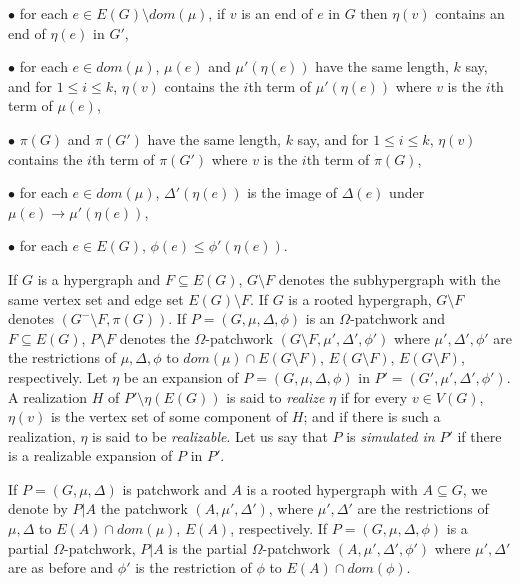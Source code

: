 \hspace*{12pt}$\bullet$ for each $e \in E(G) \setminus dom(\mu)$, if $v$ is an end of $e$ in $G$ then $\eta(v)$ contains an end of $\eta(e)$ in $G'$,

\hspace*{12pt}$\bullet$ for each $e \in dom(\mu)$, $\mu(e)$ and $\mu'(\eta(e))$ have the same length, $k$ say, and for $1 \le i \le k$, $\eta(v)$ contains the $i$th term of $\mu'(\eta(e))$ where $v$ is the $i$th term of $\mu(e)$,

\hspace*{12pt}$\bullet$ $\pi(G)$ and $\pi(G')$ have the same length, $k$ say, and for $1 \le i \le k$, $\eta(v)$ contains the $i$th term of $\pi(G')$ where $v$ is the $i$th term of $\pi(G)$,

\hspace*{12pt}$\bullet$ for each $e \in dom(\mu)$, $\Delta'(\eta(e))$ is the image of $\Delta(e)$ under $\mu(e) \to \mu'(\eta(e))$,

\hspace*{12pt}$\bullet$ for each $e \in E(G)$, $\phi(e) \le \phi'(\eta(e))$.

If $G$ is a hypergraph and $F \subseteq E(G)$, $G \setminus F$ denotes the subhypergraph with the same vertex set and edge set $E(G) \setminus F$. If $G$ is a rooted hypergraph, $G \setminus F$ denotes $(G^- \setminus F, \pi(G))$. If $P = (G, \mu, \Delta, \phi)$ is an $\Omega$-patchwork and $F \subseteq E(G)$, $P \setminus F$ denotes the $\Omega$-patchwork $(G \setminus F, \mu', \Delta', \phi')$ where $\mu', \Delta', \phi'$ are the restrictions of $\mu, \Delta, \phi$ to $dom(\mu) \cap E(G \setminus F)$, $E(G \setminus F)$, $E(G \setminus F)$, respectively. Let $\eta$ be an expansion of $P = (G, \mu, \Delta, \phi)$ in $P' = (G', \mu', \Delta', \phi')$. A realization $H$ of $P' \setminus \eta(E(G))$ is said to \textit{realize} $\eta$ if for every $v \in V(G)$, $\eta(v)$ is the vertex set of some component of $H$; and if there is such a realization, $\eta$ is said to be \textit{realizable}. Let us say that $P$ is \textit{simulated in} $P'$ if there is a realizable expansion of $P$ in $P'$.

If $P = (G, \mu, \Delta)$ is patchwork and $A$ is a rooted hypergraph with $A \subseteq G$, we denote by $P|A$ the patchwork $(A, \mu', \Delta')$, where $\mu', \Delta'$ are the restrictions of $\mu, \Delta$ to $E(A) \cap dom(\mu)$, $E(A)$, respectively. If $P = (G, \mu, \Delta, \phi)$ is a partial $\Omega$-patchwork, $P|A$ is the partial $\Omega$-patchwork $(A, \mu', \Delta', \phi')$ where $\mu', \Delta'$ are as before and $\phi'$ is the restriction of $\phi$ to $E(A) \cap dom(\phi)$.

